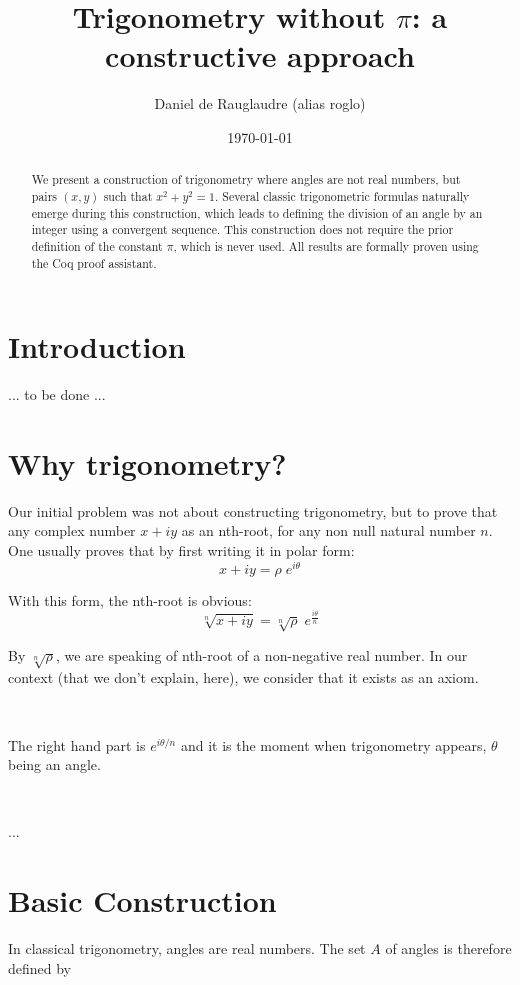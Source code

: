\documentclass[11pt]{article}
\title{Trigonometry without $\pi$: a constructive approach}
\author{Daniel de Rauglaudre (alias roglo)}
\date{\today}
\theoremstyle{definition}
\begin{document}
\maketitle

\begin{abstract}
We present a construction of trigonometry where angles are not real
numbers, but pairs $(x,y)$ such that $x^2 + y^2 = 1$. Several classic
trigonometric formulas naturally emerge during this construction,
which leads to defining the division of an angle by an integer using a
convergent sequence. This construction does not require the prior
definition of the constant $\pi$, which is never used. All results are
formally proven using the Coq proof assistant.
\end{abstract}

\section*{Introduction}

... to be done ...

\section{Why trigonometry?}

Our initial problem was not about constructing trigonometry, but to
prove that any complex number $x+iy$ as an nth-root, for any non null
natural number $n$. One usually proves that by first writing it in
polar form:
\[
x + i y = \rho \; e^{i \theta}
\]

\noindent With this form, the nth-root is obvious:
\[
\sqrt[n]{x + i y} = \sqrt[n]\rho \; e^{\frac{i\theta}{n}}
\]

\noindent By $\sqrt[n]\rho$, we are speaking of nth-root of a
non-negative real number. In our context (that we don't explain,
here), we consider that it exists as an axiom.

\

\noindent The right hand part is $e^{i\theta/n}$ and it is the moment
when trigonometry appears, $\theta$ being an angle.

\

...

\section{Basic Construction}

In classical trigonometry, angles are real numbers. The set \( A \) of
angles is therefore defined by
\end{document}
